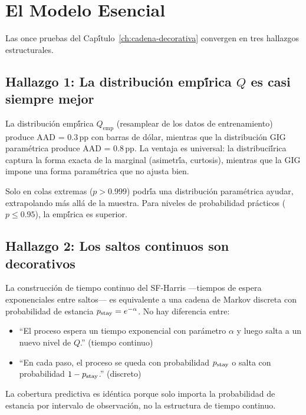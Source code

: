 
\chapter{El Modelo Esencial}
\label{ch:modelo-esencial}

Las once pruebas del Cap\'{\'i}tulo~\ref{ch:cadena-decorativa} convergen en tres
hallazgos estructurales.

\section{Hallazgo 1: La distribuci\'{o}n emp\'{\'i}rica $Q$ es casi siempre mejor}

La distribuci\'{o}n emp\'{\'i}rica $Q_{\text{emp}}$ (resamplear de los datos de
entrenamiento) produce AAD = 0.3\,pp con barras de d\'{o}lar, mientras que la
distribuci\'{o}n GIG param\'{e}trica produce AAD = 0.8\,pp. La ventaja es universal:
la distribuci\'{\'i}rica captura la forma exacta de la marginal (asimetr\'{\'i}a,
curtosis), mientras que la GIG impone una forma param\'{e}trica que no ajusta bien.

Solo en colas extremas ($p > 0.999$) podr\'{\'i}a una distribuci\'{o}n param\'{e}trica
ayudar, extrapolando m\'{a}s all\'{a} de la muestra. Para niveles de probabilidad
pr\'{a}cticos ($p \leq 0.95$), la emp\'{\'i}rica es superior.

\section{Hallazgo 2: Los saltos continuos son decorativos}

La construcci\'{o}n de tiempo continuo del SF-Harris ---tiempos de espera exponenciales
entre saltos--- es equivalente a una cadena de Markov discreta con probabilidad de
estancia $p_{\text{stay}} = e^{-\alpha}$. No hay diferencia entre:
\begin{itemize}
    \item ``El proceso espera un tiempo exponencial con par\'{a}metro $\alpha$ y luego
          salta a un nuevo nivel de $Q$.'' (tiempo continuo)
    \item ``En cada paso, el proceso se queda con probabilidad $p_{\text{stay}}$ o salta con
          probabilidad $1 - p_{\text{stay}}$.'' (discreto)
\end{itemize}
La cobertura predictiva es id\'{e}ntica porque solo importa la probabilidad de
estancia por intervalo de observaci\'{o}n, no la estructura de tiempo continuo.

